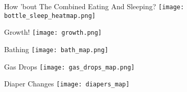 \begin{frame}{How 'bout The Combined Eating And Sleeping?}
\centering
\texttt{[image: bottle\_sleep\_heatmap.png]}
\end{frame}

\begin{frame}{Growth!}
\centering
\texttt{[image: growth.png]}
\end{frame}

\begin{frame}{Bathing}
\centering
\texttt{[image: bath\_map.png]}
\end{frame}

\begin{frame}{Gas Drops}
\centering
\texttt{[image: gas\_drops\_map.png]}
\end{frame}

\begin{frame}{Diaper Changes}
\centering
\texttt{[image: diapers\_map]}
\end{frame}


